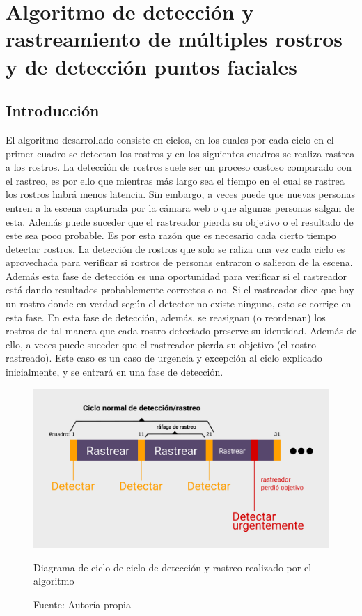 \documentclass[a4paper,openright,12pt]{report}
\begin{document}
\section{Algoritmo de detección y rastreamiento de múltiples rostros y
de detección puntos faciales}

\subsection{Introducción}
El algoritmo desarrollado consiste en ciclos, en los cuales por cada ciclo en
el primer cuadro se detectan los rostros y en los siguientes cuadros se realiza
rastrea a los rostros. La detección de rostros suele ser un proceso costoso
comparado con el rastreo, es por ello que mientras más largo sea el tiempo en el
cual se rastrea los rostros habrá menos latencia. Sin embargo, a veces puede que
nuevas personas entren a la escena capturada por la cámara web o que algunas
personas salgan de esta. Además puede suceder que el rastreador pierda su objetivo o
el resultado de este sea poco probable. Es por esta razón que es necesario cada
cierto tiempo detectar rostros. La detección de rostros que solo se raliza una
vez cada ciclo es aprovechada para verificar si rostros de personas entraron o
salieron de la escena. Además esta fase de detección es una oportunidad para
verificar si el rastreador está dando resultados probablemente correctos o no.
Si el rastreador dice que hay un rostro donde en verdad según el detector no
existe ninguno, esto se corrige en esta fase. En esta fase de detección, además,
se reasignan (o reordenan) los rostros de tal manera que cada rostro detectado
preserve su identidad. Además de ello, a veces puede suceder que el rastreador
pierda su objetivo (el rostro rastreado). Este caso es un caso de urgencia y
excepción al ciclo explicado inicialmente, y se entrará en una fase de
detección.

\begin{figure}[!h]
  \centering
    \includegraphics[width=1.0\textwidth]{../images/diagrama-rafagas-cheesefacetrack.png}\par
  \caption{Diagrama de ciclo de ciclo de detección y rastreo realizado por
           el algoritmo}
    \label{fig:diagrama-rafagas-cheesefacetrack}
  \caption*{Fuente: Autoría propia}
\end{figure}
\end{document}

